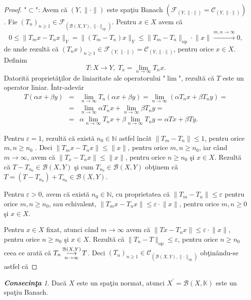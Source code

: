 \documentclass[ a4paper, 12pt]{report}
\theoremstyle{definition}
\theoremstyle{remark}
\newtheorem{cons}{\bf Consecin\c ta }[section]
\numberwithin{equation}{section}
\begin{document}
\begin{proof}
"$\subset$":
Avem c\u a $(Y,\lVert \cdot \rVert)$ este spa\c tiu Banach $(\mathcal{F}_{(Y,\lVert \cdot \rVert)}= \mathcal{C}_{(Y,\lVert \cdot \rVert)})$.
Fie $(T_n)_{n \geq 1} \in \mathcal{F}_{\left( \mathcal{B}(X,Y),\lVert \cdot \rVert_{\mbox{op}}\right)}$.
Pentru  $x \in X$ avem c\u a
$$0 \leq \lVert T_m x - T_n x \rVert_{Y} = \lVert (T_m - T_n )x \rVert_{Y} \leq \lVert T_m-T_n  \rVert_{\mbox{op}} \cdot \lVert x \rVert \stackrel{m,n \rightarrow \infty}{\longrightarrow} 0, $$
 de unde rezult\u a  c\u a $(T_n x)_{n \geq 1} \in \mathcal{F}_{(Y,\lVert \cdot \rVert)} = \mathcal{C}_{(Y,\lVert \cdot \rVert)}$, pentru orice $x \in X.$
Definim
$$T : X \rightarrow Y,\;  T_x = \lim\limits_{n \rightarrow \infty}T_n x.$$
Datorit\u a propriet\u a\c tilor  de liniaritate ale operatorului "$\lim$", rezult\u a c\u a $T$ este un operator liniar. \^ Intr-adev\u ar
\begin{eqnarray*}
T(\alpha x+\beta y) &=& \lim\limits_{n \to \infty}T_n(\alpha x + \beta y) = \lim\limits_{n \to \infty}(\alpha T_n x + \beta T_n y) = \\
&=&\lim\limits_{n \to \infty}\alpha T_nx + \lim\limits_{n \to \infty} \beta T_n y = \\
&=& \alpha \lim\limits_{n \to \infty} T_nx + \beta \lim\limits_{n \to \infty} T_n y =   \alpha Tx + \beta Ty.
\end{eqnarray*}

Pentru $\varepsilon = 1$, rezult\u a c\u a exist\u a $n_0 \in \mathbb{N}$ astfel \^inc\^at $\lVert T_m-T_n \rVert \leq 1$, pentru orice $m,n \geq n_0$ . Deci $\lVert T_m x - T_n x \rVert \leq \lVert x \rVert$, pentru orice $m,n \geq n_0$, iar c\^and $m \longrightarrow \infty$, avem c\u a  $\lVert T_x - T_n x \rVert \leq \lVert x \rVert$, pentru orice $n \geq n_0$ \c si $x \in X$. Rezult\u a c\u a
$T - T_{n_0} \in \mathcal{B}(X,Y)$ \c si cum $T_{n_0} \in \mathcal{B}(X,Y)$ ob\c tinem c\u a $T = (T - T_{n_0}) + T_{n_0} \in \mathcal{B}(X,Y)$.

Pentru $\varepsilon >0$, avem c\u a exist\u a $n_0 \in \mathbb{N}$, cu proprietatea c\u a $\lVert T_m - T_n \rVert \leq \varepsilon$ pentru orice $m,n \geq n_0$, sau echivalent, $\lVert T_m x - T_n x \rVert \leq \varepsilon \cdot  \lVert x \rVert$, pentru orice $m,n \geq 0$ \c si $x \in X$.

Pentru $x \in X$ fixat, atunci c\^and $m \longrightarrow \infty$ avem c\u a $\lVert Tx - T_n x \rVert \leq \varepsilon \cdot  \lVert x \rVert$, pentru orice $n \geq n_0$ \c si $x \in X$. Rezult\u a c\u a $\lVert T_n - T \rVert_{\mbox{op}} \leq \varepsilon$, pentru orice $n \geq n_0$ ceea ce arat\u a c\u a $T_n \pound\limits_{n \rightarrow \infty}^{\mathcal{B}(X,Y)} T$. Deci $(T_n)_{n \geq 1} \in \mathcal{C}_{\left( \mathcal{B}(X,Y),  \lVert \cdot \rVert_{\mbox{op}}\right)}$ ob\c tin\^ andu-se astfel c\u a



\end{proof}
\begin{cons}
Dac\u a $X$ este un spa\c tiu normat, atunci $X^{'} = \mathcal{B}(X,\mathbb{K})$ este un spa\c tiu Banach.
\end{cons}
\end{document}
